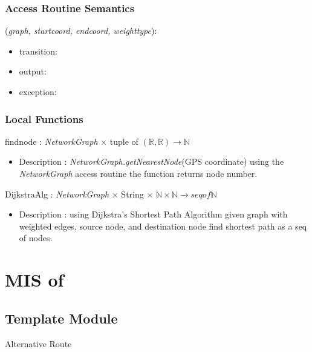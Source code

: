 \documentclass[12pt, titlepage]{article}
\begin{document}
\subsubsection{Access Routine Semantics}

\noindent {}(\emph{graph, startcoord, endcoord, weighttype}):
\begin{itemize}
\item transition:  
\item output:  
\item exception:  
\end{itemize}

\subsubsection{Local Functions}

findnode : \emph{NetworkGraph} $\times$ tuple of $(\mathbb{R}, \mathbb{R})  \rightarrow \mathbb{N}$
\begin{itemize}
    \item Description : \emph{NetworkGraph.getNearestNode}(GPS coordinate) using the \emph{NetworkGraph} access routine the function returns node number.
\end{itemize}
DijkstraAlg : \emph{NetworkGraph} $\times$ String $\times$ $\mathbb{N} \times \mathbb{N}  \rightarrow seq of \mathbb{N}$
\begin{itemize}
    \item Description : using Dijkstra’s Shortest Path Algorithm given graph with weighted edges, source node, and destination node find shortest path as a seq of nodes.
\end{itemize}
\newpage

\section{MIS of } \label{ModuleSPath} 

\subsection{Template Module}
Alternative Route
\end{document}
